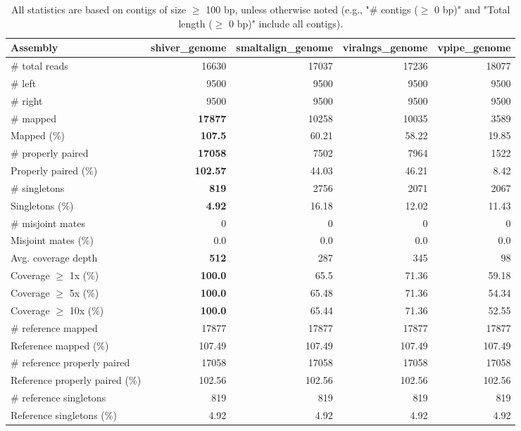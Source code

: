 \documentclass[12pt,a4paper]{article}
\begin{document}
\begin{table}[ht]
\begin{center}
\caption{All statistics are based on contigs of size $\geq$ 100 bp, unless otherwise noted (e.g., "\# contigs ($\geq$ 0 bp)" and "Total length ($\geq$ 0 bp)" include all contigs).}
\begin{tabular}{|l*{4}{|r}|}
\hline
Assembly & shiver\_genome & smaltalign\_genome & viralngs\_genome & vpipe\_genome \\ \hline
\# total reads & 16630 & 17037 & 17236 & 18077 \\ \hline
\# left & 9500 & 9500 & 9500 & 9500 \\ \hline
\# right & 9500 & 9500 & 9500 & 9500 \\ \hline
\# mapped & {\bf 17877} & 10258 & 10035 & 3589 \\ \hline
Mapped (\%) & {\bf 107.5} & 60.21 & 58.22 & 19.85 \\ \hline
\# properly paired & {\bf 17058} & 7502 & 7964 & 1522 \\ \hline
Properly paired (\%) & {\bf 102.57} & 44.03 & 46.21 & 8.42 \\ \hline
\# singletons & {\bf 819} & 2756 & 2071 & 2067 \\ \hline
Singletons (\%) & {\bf 4.92} & 16.18 & 12.02 & 11.43 \\ \hline
\# misjoint mates & 0 & 0 & 0 & 0 \\ \hline
Misjoint mates (\%) & 0.0 & 0.0 & 0.0 & 0.0 \\ \hline
Avg. coverage depth & {\bf 512} & 287 & 345 & 98 \\ \hline
Coverage $\geq$ 1x (\%) & {\bf 100.0} & 65.5 & 71.36 & 59.18 \\ \hline
Coverage $\geq$ 5x (\%) & {\bf 100.0} & 65.48 & 71.36 & 54.34 \\ \hline
Coverage $\geq$ 10x (\%) & {\bf 100.0} & 65.44 & 71.36 & 52.55 \\ \hline
\# reference mapped & 17877 & 17877 & 17877 & 17877 \\ \hline
Reference mapped (\%) & 107.49 & 107.49 & 107.49 & 107.49 \\ \hline
\# reference properly paired & 17058 & 17058 & 17058 & 17058 \\ \hline
Reference properly paired (\%) & 102.56 & 102.56 & 102.56 & 102.56 \\ \hline
\# reference singletons & 819 & 819 & 819 & 819 \\ \hline
Reference singletons (\%) & 4.92 & 4.92 & 4.92 & 4.92 \\ \hline

\end{tabular}
\end{center}
\end{table}
\end{document}
